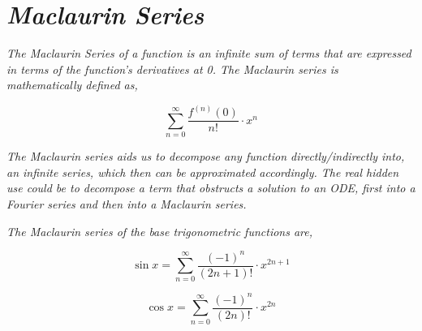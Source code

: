 

\section{\textit{Maclaurin Series}}

	\textit{The Maclaurin Series of a function is an infinite sum of terms that are expressed in terms of the function's derivatives at 0. The Maclaurin series is mathematically defined as,}

		$$\sum_{n=0}^{\infty}\frac{f^{(n)}(0)}{n!}\cdot x^n$$

	\textit{The Maclaurin series aids us to decompose any function directly/indirectly into, an infinite series, which then can be approximated accordingly. The real hidden use could be to decompose a term that obstructs a solution to an ODE, first into a Fourier series and then into a Maclaurin series.}

	\textit{The Maclaurin series of the base trigonometric functions are,}

		$$\sin x = \sum_{n=0}^{\infty}\frac{(-1)^n}{(2n+1)!}\cdot x^{2n+1}$$
		
		$$\cos x = \sum_{n=0}^{\infty}\frac{(-1)^n}{(2n)!}\cdot x^{2n}$$		
		


